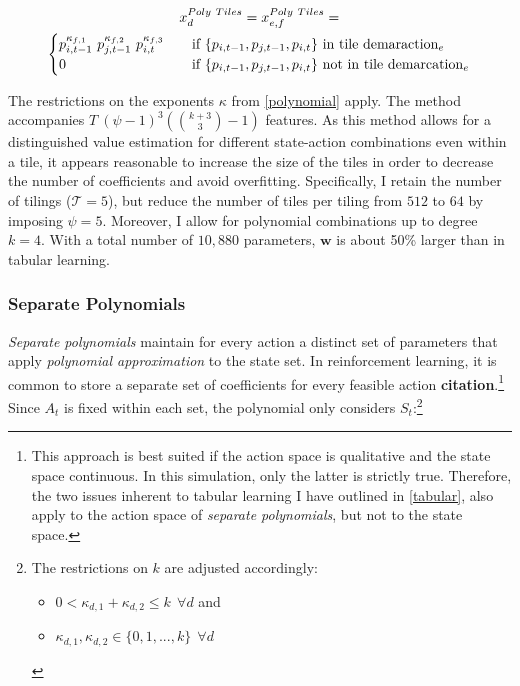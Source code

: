 \begin{gather}\label{poly_tiling_extraction}
x_d^{Poly~Tiles} = x_{e,f}^{Poly~Tiles} = \notag \\
\begin{cases}
p_{i, t-1}^{\kappa_{f,1}} ~ p_{j, t-1}^{\kappa_{f,2}} ~ p_{i, t}^{\kappa_{f,3}} & \quad \text{if } \{p_{i, t-1}, p_{j, t-1}, p_{i, t}\} \text{~in tile demaraction}_e  \\
0 & \quad \text{if } \{p_{i, t-1}, p_{j, t-1}, p_{i, t}\} \text{~not in tile demarcation}_e \\ \end{cases} 
\end{gather}

The restrictions on the exponents $\kappa$ from \autoref{polynomial} apply. The method accompanies $T~(\psi - 1)^3 ({k + 3\choose3}  - 1)$ features. As this method allows for a distinguished value estimation for different state-action combinations even within a tile, it appears reasonable to increase the size of the tiles in order to decrease the number of coefficients and avoid overfitting. Specifically, I retain the number of tilings ($\mathcal{T} = 5$), but reduce the number of tiles per tiling from $512$ to $64$ by imposing $\psi = 5$. Moreover, I allow for polynomial combinations up to degree $k=4$. With a total number of $10,880$ parameters, $\boldsymbol{w}$ is about 50\% larger than in tabular learning.

\subsubsection{Separate Polynomials}

\emph{Separate polynomials} maintain for every action a distinct set of parameters that apply \emph{polynomial approximation} to the state set. In reinforcement learning, it is common to store a separate set of coefficients for every feasible action \textbf{citation}.\footnote{This approach is best suited if the action space is qualitative and the state space continuous. In this simulation, only the latter is strictly true. Therefore, the two issues inherent to tabular learning I have outlined in \autoref{tabular}, also apply to the action space of \emph{separate polynomials}, but not to the state space.} Since $A_t$ is fixed within each set, the polynomial only considers $S_t$:\footnote{The restrictions on $k$ are adjusted accordingly:
	\begin{itemize}
		\item $0 < \kappa_{d,1} + \kappa_{d,2}  \leq k  ~~ \forall d$ and
		\item $\kappa_{d,1}, \kappa_{d,2} \in \{0, 1, ..., k\} ~~  \forall d$
	\end{itemize}
}


